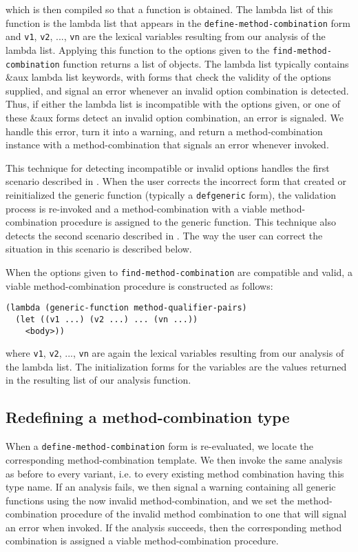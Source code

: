 \noindent
which is then compiled so that a function is obtained.  The lambda
list of this function is the lambda list that appears in the
\texttt{define-method-combination} form and \texttt{v1}, \texttt{v2},
..., \texttt{vn} are the lexical variables resulting from our analysis
of the lambda list.  Applying this function to the options given to
the \texttt{find-method-combination} function returns a list of
objects.  The lambda list typically
contains \&aux lambda list keywords, with forms that check the
validity of the options supplied, and signal an error whenever an
invalid option combination is detected.  Thus, if either the lambda
list is incompatible with the options given, or one of these \&aux
forms detect an invalid option combination, an error is signaled.  We
handle this error, turn it into a warning, and return a
method-combination instance with a method-combination that signals an
error whenever invoked.

This technique for detecting incompatible or invalid options handles
the first scenario described in .  When the
user corrects the incorrect form that created or reinitialized the
generic function (typically a \texttt{defgeneric} form), the
validation process is re-invoked and a method-combination with a
viable method-combination procedure is assigned to the generic
function.  This technique also detects the second scenario described
in .  The way the user can correct the
situation in this scenario is described below.

When the options given to \texttt{find-method-combination} are
compatible and valid, a viable method-combination procedure is
constructed as follows:

\begin{verbatim}
(lambda (generic-function method-qualifier-pairs)
  (let ((v1 ...) (v2 ...) ... (vn ...))
    <body>))
\end{verbatim}

\noindent
where \texttt{v1}, \texttt{v2}, ..., \texttt{vn} are again the lexical
variables resulting from our analysis of the lambda list.  The
initialization forms for the variables are the values returned in the
resulting list of our analysis function.

\subsection{Redefining a method-combination type}

When a \texttt{define-method-combination} form is re-evaluated, we
locate the corresponding method-combination template.  We then invoke
the same analysis as before to every variant, i.e. to every existing
method combination having this type name.  If an analysis fails, we
then signal a warning containing all generic functions using the now
invalid method-combination, and we set the method-combination
procedure of the invalid method combination to one that will signal an
error when invoked.  If the analysis succeeds, then the corresponding
method combination is assigned a viable method-combination procedure.

